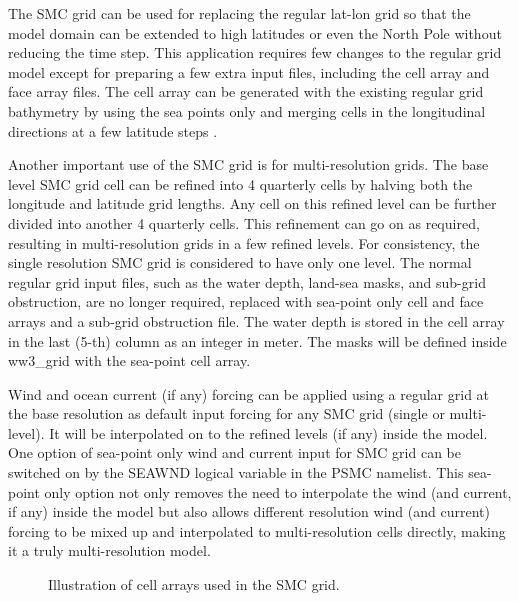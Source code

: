The SMC grid can be used for replacing the regular lat-lon grid so that the
model domain can be extended to high latitudes or even the North Pole without
reducing the time step. This application requires few changes to the
regular grid model except for preparing a few extra input files, including the
cell array and face array files. The cell array can be generated with the
existing regular grid bathymetry by using the sea points only and merging
cells in the longitudinal directions at a few latitude steps \citep{art:Li11}.

Another important use of the SMC grid is for multi-resolution grids.
The base level SMC grid cell can be refined into 4 quarterly cells
by halving both the longitude and latitude grid lengths. Any cell
on this refined level can be further divided into another 4 quarterly
cells. This refinement can go on as required, resulting in multi-resolution
grids in a few refined levels. For consistency, the single resolution
SMC grid is considered to have only one level.  The normal regular grid input 
files, such as the water depth, land-sea masks, and sub-grid obstruction,
are no longer required, replaced with sea-point only cell and face arrays
and a sub-grid obstruction file.  The water depth is stored in the cell array 
in the last (5-th) column as an integer in meter.  The masks will be defined  
inside ww3\_grid with the sea-point cell array.

Wind and ocean current (if any) forcing can be applied using a regular grid at 
the base resolution as default input forcing for any SMC grid (single or multi-
level).  It will be interpolated on to the refined levels (if any) inside the 
model.  One option of sea-point only wind and current input for SMC grid can be 
switched on by the {\code SEAWND} logical variable in the {\F PSMC} namelist.  
This sea-point only option not only removes the need to interpolate the wind 
(and current, if any) inside the model but also allows different resolution 
wind (and current) forcing to be mixed up and interpolated to multi-resolution 
cells directly, making it a truly multi-resolution model. 

\begin{figure}
\centerline{}
\caption{Illustration of cell arrays used in the SMC grid.}
\label{fig:SMCells} \botline
\end{figure}

